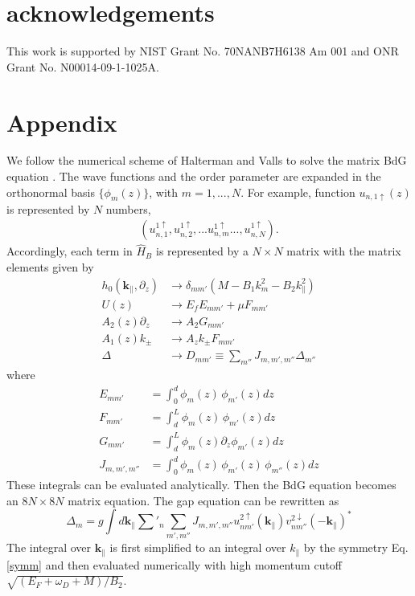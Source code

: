 \documentclass[11pt]{report}
\newcommand{\kperp}{\mathbf{k}_\parallel}
\begin{document}
\section{acknowledgements}
This work is supported by NIST Grant No. 70NANB7H6138 Am 001 
and ONR Grant No. N00014-09-1-1025A. 

\appendix*
\section*{Appendix}
We follow the numerical scheme of Halterman and Valls to solve 
the matrix BdG equation \cite{h-v}. The wave functions and the order parameter
are expanded in the orthonormal basis $\{\phi_m(z)\}$, with $m=1,...,N$. For example,
function $u_{n,1\uparrow}(z)$ is represented by $N$ numbers,
\begin{align*}
(u^{1\uparrow}_{n,1},u^{1\uparrow}_{n,2},...u^{1\uparrow}_{n,m}...,u^{1\uparrow}_{n,N}).
\end{align*}
Accordingly, each term in $\hat{H}_{B}$ is represented
by a $N\times N$ matrix with the matrix elements given by
\begin{align*}
h_0(\kperp,\partial_z) &\rightarrow \delta_{mm'}(M - B_1 k_m^2 - B_2 k_\parallel^2) \\
U(z) &\rightarrow E_f E_{mm'} + \mu F_{mm'} \\
 A_2(z) \partial_z &\rightarrow A_2 G_{mm'}\\
 A_1(z) k_\pm &\rightarrow A_z k_\pm F_{mm'} \\
 \Delta &\rightarrow D_{mm'}\equiv \sum_{m''}J_{m,m',m''}\Delta_{m''}
\end{align*}
where 
\begin{align*}
E_{mm'}&=\int_0^{d} \phi_m(z) \, \phi_{m'}(z) dz \\
F_{mm'}&=\int_d^{L} \phi_m(z) \, \phi_{m'}(z) dz \\
G_{mm'}&=\int_d^{L} \phi_m(z) \partial_z \phi_{m'}(z) dz\\
J_{m,m',m''}&=\int_0^{d} \phi_m(z) \, \phi_{m'}(z) \, \phi_{m''}(z) dz
\end{align*}
These integrals can be evaluated analytically. Then the BdG equation becomes
an $8N\times 8N$ matrix equation. The gap equation can be rewritten as
\[
\Delta_{m}=g\int d\kperp \sum'_n \sum_{m',m''} J_{m,m',m''}
u^{2\uparrow}_{nm'}(\kperp)v^{2\downarrow}_{nm''}(-\kperp)^* 
\]
The integral over $\kperp$ is first simplified to an integral over $k_\parallel$
by the symmetry Eq. \eqref{symm} and then evaluated numerically with high 
momentum cutoff 
$\sqrt{(E_F+\omega_D+M)/B_2}$.
\end{document}
